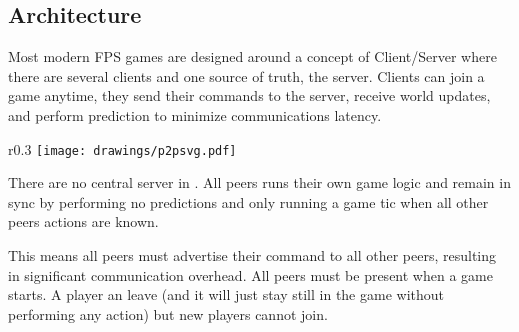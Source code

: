 \subsection{Architecture}
Most modern FPS games are designed around a concept of Client/Server where there are several clients and one source of truth, the server. Clients can join a game anytime, they send their commands to the server, receive world updates, and perform prediction to minimize communications latency.\\
\par
\begin{wrapfigure}[9]{r}{0.3\textwidth}
\centering
\texttt{[image: drawings/p2psvg.pdf]}
\end{wrapfigure}
There are no central server in \doom. All peers runs their own game logic and remain in sync by performing no predictions and only running a game tic when all other peers actions are known.\\
\par
 This means all peers must advertise their command to all other peers, resulting in significant communication overhead. 
All peers must be present when a game starts. A player an leave (and it will just stay still in the game without performing any action) but new players cannot join.
\pagebreak





